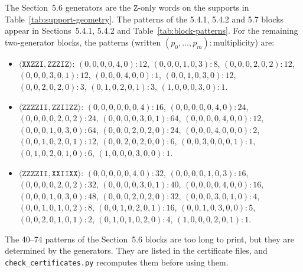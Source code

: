 \documentclass[11pt]{article}
\begin{document}
The Section~5.6 generators are the \(\mathtt{Z}\)-only words on the supports in Table~\ref{tab:support-geometry}. The patterns of the 5.4.1, 5.4.2 and 5.7 blocks appear in Sections~5.4.1, 5.4.2 and Table~\ref{tab:block-patterns}. For the remaining two-generator blocks, the patterns (written \((p_0,\dots,p_m)\!:\)multiplicity) are:

{\raggedright
\begin{itemize}
\item \(\langle\mathtt{XXZZI},\mathtt{ZZZIZ}\rangle\): \mbox{\((0,0,0,0,4,0)\!:\!12\)}, \mbox{\((0,0,0,1,0,3)\!:\!8\)}, \mbox{\((0,0,0,2,0,2)\!:\!12\)}, \mbox{\((0,0,0,3,0,1)\!:\!12\)}, \mbox{\((0,0,0,4,0,0)\!:\!1\)}, \mbox{\((0,0,1,0,3,0)\!:\!12\)}, \mbox{\((0,0,2,0,2,0)\!:\!3\)}, \mbox{\((0,1,0,2,0,1)\!:\!3\)}, \mbox{\((1,0,0,0,3,0)\!:\!1\)}.
\item \(\langle\mathtt{ZZZZII},\mathtt{ZZIIZZ}\rangle\): \mbox{\((0,0,0,0,0,0,4)\!:\!16\)}, \mbox{\((0,0,0,0,0,4,0)\!:\!24\)}, \mbox{\((0,0,0,0,2,0,2)\!:\!24\)}, \mbox{\((0,0,0,0,3,0,1)\!:\!64\)}, \mbox{\((0,0,0,0,4,0,0)\!:\!12\)}, \mbox{\((0,0,0,1,0,3,0)\!:\!64\)}, \mbox{\((0,0,0,2,0,2,0)\!:\!24\)}, \mbox{\((0,0,0,4,0,0,0)\!:\!2\)}, \mbox{\((0,0,1,0,2,0,1)\!:\!12\)}, \mbox{\((0,0,2,0,2,0,0)\!:\!6\)}, \mbox{\((0,0,3,0,0,0,1)\!:\!1\)}, \mbox{\((0,1,0,2,0,1,0)\!:\!6\)}, \mbox{\((1,0,0,0,3,0,0)\!:\!1\)}.
\item \(\langle\mathtt{ZZZZII},\mathtt{XXIIXX}\rangle\): \mbox{\((0,0,0,0,0,4,0)\!:\!32\)}, \mbox{\((0,0,0,0,1,0,3)\!:\!16\)}, \mbox{\((0,0,0,0,2,0,2)\!:\!32\)}, \mbox{\((0,0,0,0,3,0,1)\!:\!40\)}, \mbox{\((0,0,0,0,4,0,0)\!:\!16\)}, \mbox{\((0,0,0,1,0,3,0)\!:\!48\)}, \mbox{\((0,0,0,2,0,2,0)\!:\!32\)}, \mbox{\((0,0,0,3,0,1,0)\!:\!4\)}, \mbox{\((0,0,1,0,1,0,2)\!:\!8\)}, \mbox{\((0,0,1,0,2,0,1)\!:\!16\)}, \mbox{\((0,0,1,0,3,0,0)\!:\!5\)}, \mbox{\((0,0,2,0,1,0,1)\!:\!2\)}, \mbox{\((0,1,0,1,0,2,0)\!:\!4\)}, \mbox{\((1,0,0,0,2,0,1)\!:\!1\)}.
\end{itemize}\par}

The 40--74 patterns of the Section~5.6 blocks are too long to print, but they are determined by the generators. They are listed in the certificate files, and \texttt{check\_certificates.py} recomputes them before using them.
\end{document}

